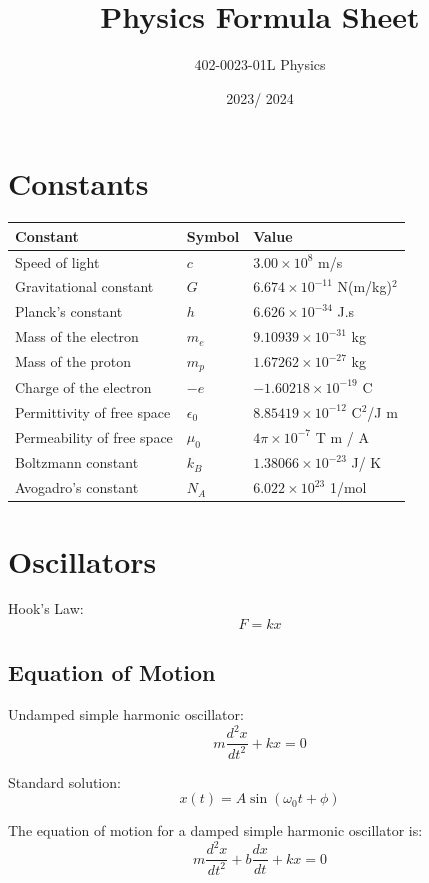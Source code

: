 \documentclass[12pt,a4paper]{article}
\title{Physics Formula Sheet}
\author{402-0023-01L  Physics}
\date{2023/ 2024}
\begin{document}
	\maketitle
	
	\section*{Constants}
	\begin{tabular}{lll}
		\toprule
		Constant & Symbol & Value \\
		\midrule
		Speed of light & \( c \) & \( 3.00 \times 10^8 \) m/s \\
		Gravitational constant & \( G \) & \( 6.674 \times 10^{-11} \) N(m/kg)\(^2\) \\
		Planck's constant & \( h \) & \( 6.626 \times 10^{-34} \) J.s \\
		Mass of the electron & \( m_e \) & \( 9.10939 \times 10^{-31} \) kg \\
		Mass of the proton & \( m_p \) & \( 1.67262 \times 10^{-27} \) kg \\
		Charge of the electron & \(-e\) & \(-1.60218 \times 10^{-19} \) C \\
		Permittivity of free space & \(\epsilon_0\) & \( 8.85419 \times 10^{-12} \) C\(^2\)/J m \\
		Permeability of free space & \(\mu_0\) & \( 4 \pi \times 10^{-7} \) T m / A \\
		Boltzmann constant & \( k_B \) & \( 1.38066 \times 10^{-23} \) J/ K \\
		Avogadro's constant & \( N_A \) & \( 6.022 \times 10^{23} \) 1/mol \\
		\bottomrule
	\end{tabular}
	
	\section*{Oscillators}
	Hook's Law: \[ F = k x \]
	\subsection*{Equation of Motion}
	Undamped simple harmonic oscillator:
	\[	m \frac{d^2 x}{dt^2} + kx = 0\]
	
	Standard solution: \[ x(t) = A \sin (\omega_0 t + \phi)\]
	
	The equation of motion for a damped simple harmonic oscillator is:
	\[
	m \frac{d^2 x}{dt^2} + b \frac{dx}{dt} + kx = 0
	\]
	
\end{document}
